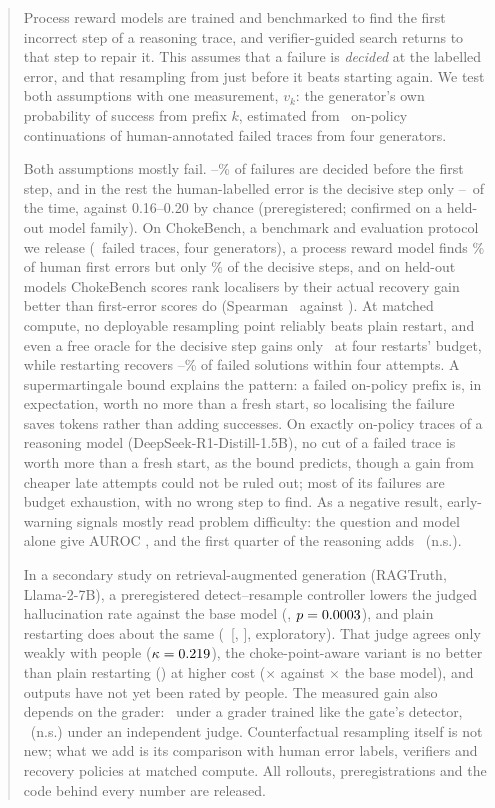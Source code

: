 \begin{abstract}
Process reward models are trained and benchmarked to find the first incorrect step of a reasoning
trace, and verifier-guided search returns to that step to repair it. This assumes that a failure
is \emph{decided} at the labelled error, and that resampling from just before it beats starting
again. We test both assumptions with one measurement, $v_k$: the generator's own probability of
success from prefix $k$, estimated from \TotalRollouts\ on-policy continuations of human-annotated
failed traces from four generators.

Both assumptions mostly fail. \QwenSmallAllCapPct--\QwenMathCapPct\% of failures are decided
before the first step, and in the rest the human-labelled error is the decisive step only
\QwenTwoAllDec--\QwenSmallAllDec\ of the time, against 0.16--0.20 by chance (preregistered; confirmed on a held-out model
family). On ChokeBench, a benchmark and evaluation protocol we release (\cbN\ failed traces, four
generators), a process reward model finds \cbPrmDropAccHPct\% of human first errors but only
\cbPrmDropAccDPct\% of the decisive steps, and on held-out models ChokeBench scores rank localisers
by their actual recovery gain better than first-error scores do (Spearman \valRhoD\ against \valRhoE). At matched compute, no deployable resampling point reliably beats
plain restart, and even a free oracle for the decisive step gains only \cbOracleGainB\ at four
restarts' budget, while restarting recovers \recMinFour--\recMaxFour\% of failed solutions within
four attempts. A supermartingale bound explains the pattern: a failed on-policy prefix is, in
expectation, worth no more than a fresh start, so localising the failure saves tokens rather than
adding successes. On exactly on-policy traces of a reasoning model (DeepSeek-R1-Distill-1.5B), no cut
of a failed trace is worth more than a fresh start, as the bound predicts, though a gain from cheaper
late attempts could not be ruled out; most of its failures are budget exhaustion, with no wrong step to
find. As a negative result, early-warning signals mostly read problem difficulty: the
question and model alone give AUROC \aucQG, and the first quarter of the reasoning adds \dIncA\ (n.s.).

In a secondary study on retrieval-augmented generation (RAGTruth, Llama-2-7B), a preregistered
detect--resample controller lowers the judged hallucination rate against the base model
(\rrHZero, $p=\rrHZeroP$), and plain restarting does about the same (\vbDraEOne\ [\vbDraEOneLo, \vbDraEOneHi],
exploratory). That judge agrees only weakly with people ($\kappa=\evEOneKappa$), the
choke-point-aware variant is no better than plain restarting (\rrHOne) at higher cost
(\costCare$\times$ against \costDra$\times$ the base model), and outputs have not yet been rated by
people. The measured gain also depends on the grader: \robBaseETwoDiff\ under a grader trained like
the gate's detector, \robBaseEOneDiff\ (n.s.) under an independent judge. Counterfactual resampling
itself is not new; what we add is its comparison with human error labels, verifiers and recovery
policies at matched compute. All rollouts, preregistrations and the code behind every number are
released.
\end{abstract}
